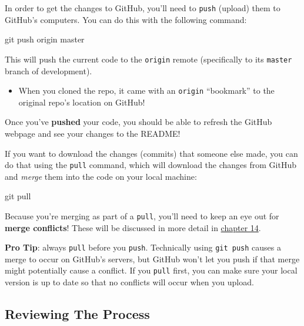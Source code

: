 \documentclass[]{book}
\newenvironment{Shaded}{\begin{snugshade}}{\end{snugshade}}
\newcommand{\FunctionTok}[1]{\textcolor[rgb]{0.00,0.00,0.00}{#1}}
\newcommand{\NormalTok}[1]{#1}
\providecommand{\tightlist}{%
  \setlength{\itemsep}{0pt}\setlength{\parskip}{0pt}}
\theoremstyle{definition}
\theoremstyle{definition}
\theoremstyle{remark}
\begin{document}
In order to get the changes to GitHub, you'll need to \texttt{push}
(upload) them to GitHub's computers. You can do this with the following
command:

\begin{Shaded}
\begin{Highlighting}[]
\FunctionTok{git}\NormalTok{ push origin master}
\end{Highlighting}
\end{Shaded}

This will push the current code to the \texttt{origin} remote
(specifically to its \texttt{master} branch of development).

\begin{itemize}
\tightlist
\item
  When you cloned the repo, it came with an \texttt{origin} ``bookmark''
  to the original repo's location on GitHub!
\end{itemize}

Once you've \textbf{pushed} your code, you should be able to refresh the
GitHub webpage and see your changes to the README!

If you want to download the changes (commits) that someone else made,
you can do that using the \texttt{pull} command, which will download the
changes from GitHub and \emph{merge} them into the code on your local
machine:

\begin{Shaded}
\begin{Highlighting}[]
\FunctionTok{git}\NormalTok{ pull}
\end{Highlighting}
\end{Shaded}

Because you're merging as part of a \texttt{pull}, you'll need to keep
an eye out for \textbf{merge conflicts}! These will be discussed in more
detail in \protect\hyperlink{git-branches}{chapter 14}.

\textbf{Pro Tip}: always \texttt{pull} before you \texttt{push}.
Technically using \texttt{git\ push} causes a merge to occur on GitHub's
servers, but GitHub won't let you push if that merge might potentially
cause a conflict. If you \texttt{pull} first, you can make sure your
local version is up to date so that no conflicts will occur when you
upload.

\subsection{Reviewing The Process}\label{reviewing-the-process-1}
\end{document}
